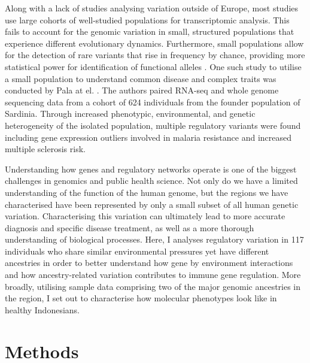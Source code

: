 \documentclass[12pt,a4paper,titlepage,twoside,openright]{book}
\begin{document}
\begin{mainmatter}
{Along with a lack of studies analysing variation outside of Europe, most studies use large cohorts of well-studied populations for transcriptomic analysis. This fails to account for the genomic variation in small, structured populations that experience different evolutionary dynamics. Furthermore, small populations allow for the detection of rare variants that rise in frequency by chance, providing more statistical power for identification of functional alleles \cite{timpson2018genetic}. One such study to utilise a small population to understand common disease and complex traits was conducted by Pala at el. \cite{pala2017population}. The authors paired RNA-seq and whole genome sequencing data from a cohort of 624 individuals from the founder population of Sardinia. Through increased phenotypic, environmental, and genetic heterogeneity of the isolated population, multiple regulatory variants were found including gene expression outliers involved in malaria resistance and increased multiple sclerosis risk.

Understanding how genes and regulatory networks operate is one of the biggest challenges in genomics and public health science. Not only do we have a limited understanding of the function of the human genome, but the regions we have characterised have been represented by only a small subset of all human genetic variation. Characterising this variation can ultimately lead to more accurate diagnosis and specific disease treatment, as well as a more thorough understanding of biological processes. Here, I analyses regulatory variation in 117 individuals who share similar environmental pressures yet have different ancestries in order to better understand how gene by environment interactions and how ancestry-related variation contributes to immune gene regulation. More broadly, utilising sample data comprising two of the major genomic ancestries in the region, I set out to characterise how molecular phenotypes look like in healthy Indonesians. 

\chapter{Methods}\label{}
}
\end{mainmatter}
\end{document}
